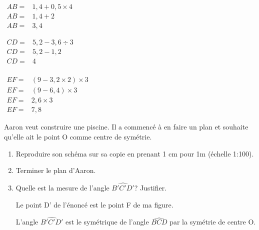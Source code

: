 \documentclass[a4paper]{book}
\begin{document}
{\begin{exercice}
        \begin{minipage}{0.3\linewidth}
            $\begin{array}{ll}
                 AB = & 1,4+0,5\times4 \\
                 AB = & 1,4+2 \\
                 AB = & 3,4
            \end{array}$
        \end{minipage}
        \hfill
        \begin{minipage}{0.3\linewidth}
            $\begin{array}{ll}
                 CD = & 5,2-3,6\div3 \\
                 CD = & 5,2-1,2 \\
                 CD = & 4 \\
            \end{array}$
        \end{minipage}
        \hfill
        \begin{minipage}{0.3\linewidth}
            $\begin{array}{ll}
                EF = & (9-3,2 \times 2) \times 3 \\
                EF = & (9-6,4) \times 3 \\
                EF = & 2,6 \times 3 \\
                EF = & 7,8 
            \end{array}$
        \end{minipage}    
    \end{exercice}


    \begin{exercice}
        \begin{minipage}{0.5\linewidth}
            Aaron veut construire une piscine. Il a commencé à en faire un plan et souhaite qu'elle ait le point O comme centre de symétrie.

            \begin{enumerate}
                \item Reproduire son schéma sur sa copie en prenant 1 cm pour 1m (échelle 1:100).
                \item Terminer le plan d'Aaron.
                \item Quelle est la mesure de l'angle $\widehat{B'C'D'}$? Justifier.

                Le point D' de l'énoncé est le point F de ma figure.

                L'angle $\widehat{B'C'D'}$ est le symétrique de l'angle $\widehat{BCD}$ par la symétrie de centre O.


\end{enumerate}
\end{minipage}
\end{exercice}}
\end{document}
